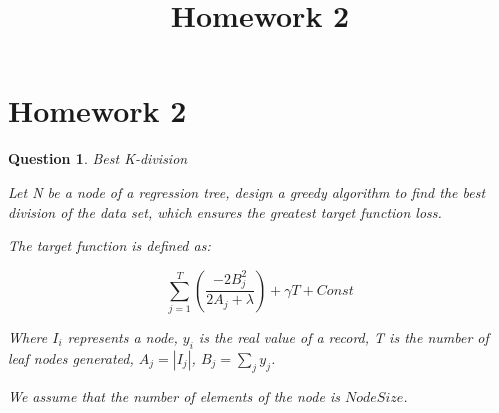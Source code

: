 \documentclass{article} %
\title{Homework 2}
\newtheorem{question}{Question}
\begin{document}
\maketitle
%


\section{Homework 2}






\begin{question} 
	
Best K-division

Let N be a node of a regression tree, design a greedy algorithm to find the best division of the data set, which ensures the greatest target function loss.

The target function is defined as:

$$\sum_{j=1}^{T}(\frac{-2B_j^2}{2A_j+\lambda})+\gamma T+Const$$

Where $I_i$ represents a node, $y_i$ is the real value of a record, T is the number of leaf nodes generated, $A_j=|I_j|$, $B_j=\sum_{j}y_j$.

We assume that the number of elements of the node is $NodeSize$.

\end{question}
\end{document}
